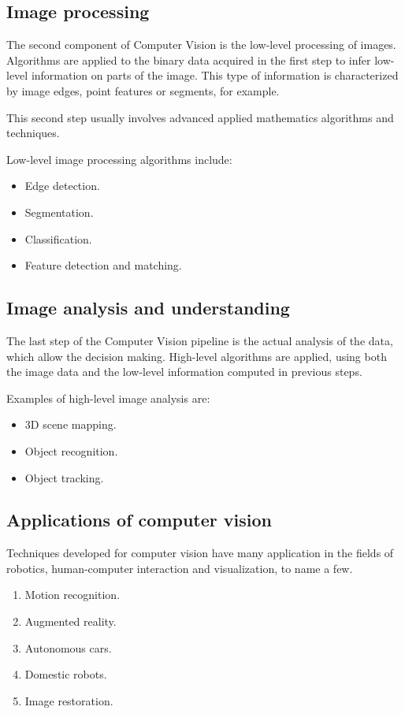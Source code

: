 \subsection{Image processing}
The second component of Computer Vision is the low-level processing of images. Algorithms are applied to the binary data acquired in the first step to infer low-level information on parts of the image. This type of information is characterized by image edges, point features or segments, for example.

This second step usually involves advanced applied mathematics algorithms and techniques.

Low-level image processing algorithms include:
\begin{itemize}
    \item Edge detection.
    \item Segmentation.
    \item Classification.
    \item Feature detection and matching.
\end{itemize}

\subsection{Image analysis and understanding}
The last step of the Computer Vision pipeline is the actual analysis of the data, which allow the decision making.
High-level algorithms are applied, using both the image data and the low-level information computed in previous steps.

Examples of high-level image analysis are:
\begin{itemize}
    \item 3D scene mapping.
    \item Object recognition.
    \item Object tracking.
\end{itemize}
\subsection{Applications of computer vision}
Techniques developed for computer vision have many application in the fields of robotics, human-computer interaction and visualization, to name a few.
\begin{enumerate}
    \item Motion recognition.
    \item Augmented reality.
    \item Autonomous cars.
    \item Domestic robots.
    \item Image restoration.
\end{enumerate}

